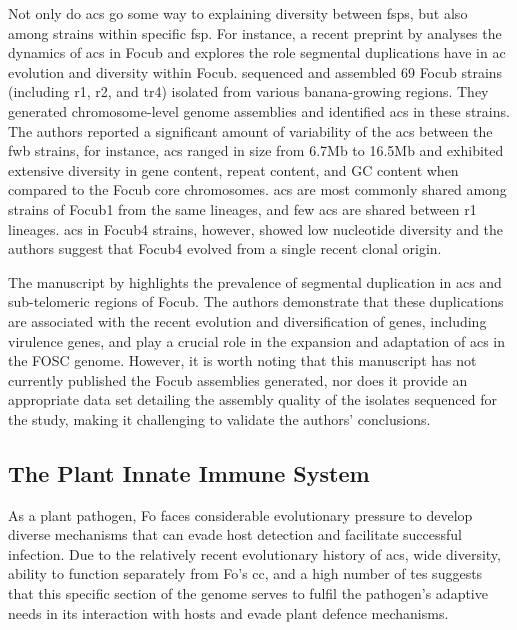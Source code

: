 Not only do \acp{ac} go some way to explaining diversity between \acp{fsp}, but also among strains within specific \ac{fsp}. For instance, a recent preprint by \textcite{Westerhoven2023} analyses the dynamics of \acp{ac} in \ac{Focub} and explores the role segmental duplications have in \ac{ac} evolution and diversity within \ac{Focub}. \textcite{Westerhoven2023} sequenced and assembled 69 \ac{Focub} strains (including \ac{r1}, \ac{r2}, and \ac{tr4})  isolated from various banana-growing regions. They generated chromosome-level genome assemblies and identified \acp{ac} in these strains.  The authors reported a significant amount of variability of the \acp{ac} between the \ac{fwb} strains, for instance, \acp{ac} ranged in size from 6.7Mb to 16.5Mb and exhibited extensive diversity in gene content, repeat content, and GC content when compared to the \ac{Focub} core chromosomes. \Acp{ac} are most commonly shared among strains of \ac{Focub1} from the same lineages, and few \acp{ac} are shared between \ac{r1} lineages. \Acp{ac} in \ac{Focub4} strains, however, showed low nucleotide diversity and the authors suggest that \ac{Focub4} evolved from a single recent clonal origin. 

The manuscript by \textcite{Westerhoven2023} highlights the prevalence of segmental duplication in \acp{ac} and sub-telomeric regions of \ac{Focub}. The authors demonstrate that these duplications are associated with the recent evolution and diversification of genes, including virulence genes, and play a crucial role in the expansion and adaptation of \acp{ac} in the \ac{FOSC} genome. However, it is worth noting that this manuscript has not currently published the \ac{Focub} assemblies generated, nor does it provide an appropriate data set detailing the assembly quality of the isolates sequenced for the study, making it challenging to validate the authors' conclusions. 

\subsection{The Plant Innate Immune System}

As a plant pathogen, \ac{Fo} faces considerable evolutionary pressure to develop diverse mechanisms that can evade host detection and facilitate successful infection. Due to the relatively recent evolutionary history of \acp{ac}, wide diversity, ability to function separately from \ac{Fo}'s \ac{cc}, and a high number of \acp{te} suggests that this specific section of the genome serves to fulfil the pathogen's adaptive needs in its interaction with hosts and evade plant defence mechanisms.

